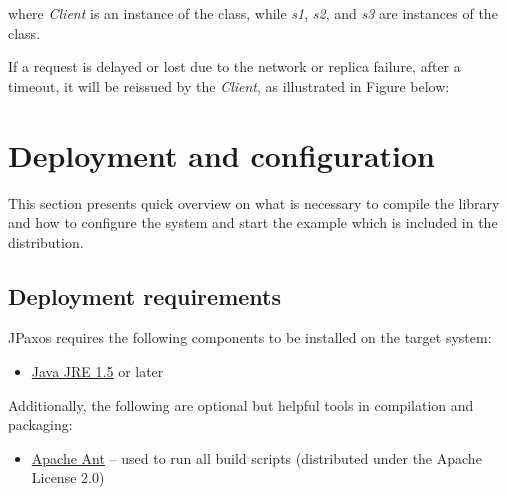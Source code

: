 where \emph{Client} is an instance of the  class, while \emph{s1}, \emph{s2},
and \emph{s3} are instances of the  class.

If a request is delayed or lost due to the network or replica failure,
after a timeout, it will be reissued by the \emph{Client}, as illustrated in
Figure below:
\begin{quote}
\begin{figure}[htbp]
\centering

\end{figure}
\end{quote}


\section{Deployment and configuration}
\label{config:deployment-and-configuration}\label{config::doc}
This section presents quick overview on what is necessary to compile the
library and how to configure the system and start the example which is included
in the distribution.


\subsection{Deployment requirements}
\label{config:deployment-requirements}
JPaxos requires the following components to be installed on the target system:
\begin{itemize}
\item {} 
\href{http://www.java.com/}{Java JRE 1.5} or later

\end{itemize}

Additionally, the following are optional but helpful tools in compilation and
packaging:
\begin{itemize}
\item {} 
\href{http://ant.apache.org/}{Apache Ant} -- used to run all build scripts (distributed under the Apache
License 2.0)

\end{itemize}


